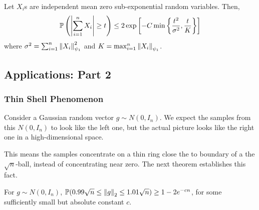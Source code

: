 \documentclass[12pt]{article}
\begin{document}
\begin{theorembox}
    Let $X_i$s are independent mean zero sub-exponential random variables. Then,
    \begin{equation*}
        \mathbb{P}\left( \left\lvert \sum_{i=1}^n X_i \right\rvert \geq t  \right) \leq 2\exp\left[ - C\min\left\{ \dfrac{t^2}{\sigma^2}, \dfrac{t}{K} \right\} \right]
    \end{equation*}
    \noindent where $\sigma^2 = \sum_{i=1}^n \left\Vert X_i \right\Vert_{\psi_1}^2$ and $K = \max_{i=1}^n \left\Vert X_i \right\Vert_{\psi_1}$.
\end{theorembox}

\subsection{Applications: Part 2}

\subsubsection{Thin Shell Phenomenon}

Consider a Gaussian random vector $g \sim N(0, I_n)$. We expect the samples from this $N(0, I_n)$ to look like the left one, but the actual picture looks like the right one in a high-dimensional space.

\begin{figure}[h]
    \centering
\end{figure}


This means the samples concentrate on a thin ring close the to boundary of a the $\sqrt{n}$-ball, instead of concentrating near zero. The next theorem establishes this fact.

\begin{theorembox}
    For $g \sim N(0, I_n)$, $\mathbb{P}(0.99\sqrt{n} \leq \left\Vert g \right\Vert_2 \leq 1.01\sqrt{n}) \geq 1 - 2e^{-cn}$, for some sufficiently small but absolute constant $c$.
\end{theorembox}
\end{document}
